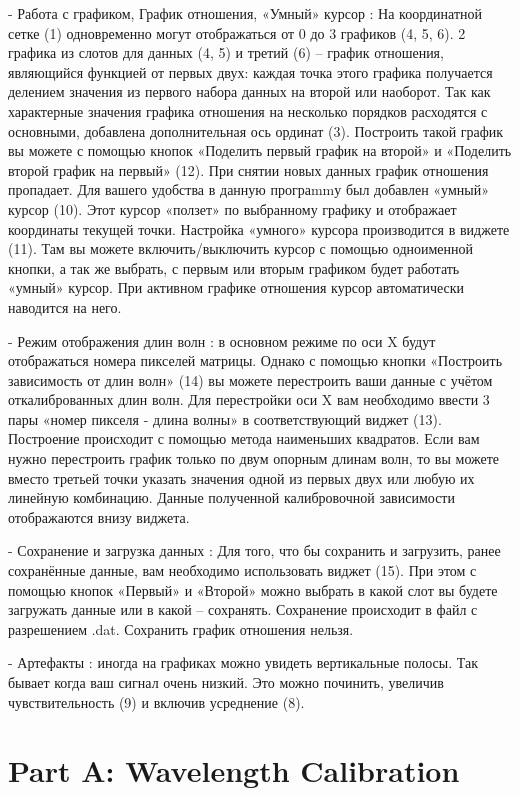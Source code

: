 \documentclass[11pt,a4paper]{article}
\begin{document}
- Работа с графиком, График отношения, «Умный» курсор : На координатной сетке (1) одновременно могут отображаться от 0 до 3 графиков (4, 5, 6). 2 графика из слотов для данных (4, 5) и третий (6) – график отношения, являющийся функцией от первых двух: каждая точка этого графика получается делением значения из первого набора данных на второй или наоборот. Так как характерные значения графика отношения на несколько порядков расходятся с основными, добавлена дополнительная ось ординат (3). Построить такой график вы можете с помощью кнопок «Поделить первый график на второй» и «Поделить второй график на первый» (12). При снятии новых данных график отношения пропадает. Для вашего удобства в данную програmmу был добавлен «умный» курсор (10). Этот курсор «ползет» по выбранному графику и отображает координаты текущей точки. Настройка «умного» курсора производится в виджете (11). Там вы можете включить/выключить курсор с помощью одноименной кнопки, а так же выбрать, с первым или вторым графиком будет работать «умный» курсор. При активном графике отношения курсор автоматически наводится на него.

- Режим отображения длин волн : в основном режиме по оси X будут отображаться номера пикселей матрицы. Однако с помощью кнопки «Построить зависимость от длин волн» (14) вы можете перестроить ваши данные с учётом откалиброванных длин волн. Для перестройки оси X вам необходимо ввести 3 пары «номер пикселя - длина волны» в соответствующий виджет (13). Построение происходит с помощью метода наименьших квадратов. Если вам нужно перестроить график только по двум опорным длинам волн, то вы можете вместо третьей точки указать значения одной из первых двух или любую их линейную комбинацию. Данные полученной калибровочной зависимости отображаются внизу виджета.

- Сохранение и загрузка данных : Для того, что бы сохранить и загрузить, ранее сохранённые данные, вам необходимо использовать виджет (15). При этом с помощью кнопок «Первый» и «Второй» можно выбрать в какой слот вы будете загружать данные или в какой – сохранять. Сохранение происходит в файл с разрешением .dat. Сохранить график отношения нельзя.

- Артефакты : иногда на графиках можно увидеть вертикальные полосы. Так бывает когда ваш сигнал очень низкий. Это можно починить, увеличив чувствительность (9) и включив усреднение (8).

\section*{Part A: Wavelength Calibration}
\end{document}
